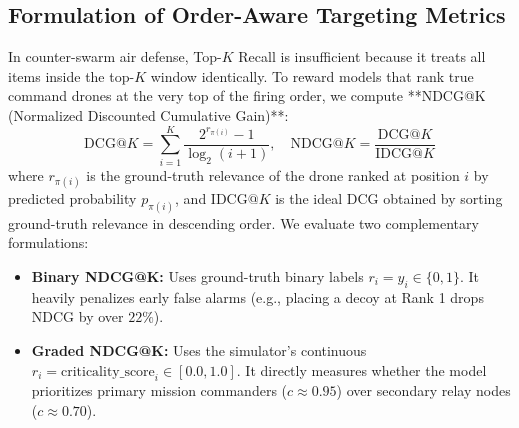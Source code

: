 \documentclass[9pt]{ieeeconf}
\begin{document}
\subsection{Formulation of Order-Aware Targeting Metrics}
In counter-swarm air defense, Top-$K$ Recall is insufficient because it treats all items inside the top-$K$ window identically. To reward models that rank true command drones at the very top of the firing order, we compute **NDCG@K (Normalized Discounted Cumulative Gain)**:
\begin{equation}
\text{DCG}@K = \sum_{i=1}^K \frac{2^{r_{\pi(i)}} - 1}{\log_2(i + 1)}, \quad \text{NDCG}@K = \frac{\text{DCG}@K}{\text{IDCG}@K}
\end{equation}
where $r_{\pi(i)}$ is the ground-truth relevance of the drone ranked at position $i$ by predicted probability $p_{\pi(i)}$, and $\text{IDCG}@K$ is the ideal DCG obtained by sorting ground-truth relevance in descending order. We evaluate two complementary formulations:
\begin{itemize}
    \item \textbf{Binary NDCG@K:} Uses ground-truth binary labels $r_i = y_i \in \{0, 1\}$. It heavily penalizes early false alarms (e.g., placing a decoy at Rank 1 drops NDCG by over $22\%$).
    \item \textbf{Graded NDCG@K:} Uses the simulator's continuous $r_i = \text{criticality\_score}_i \in [0.0, 1.0]$. It directly measures whether the model prioritizes primary mission commanders ($c \approx 0.95$) over secondary relay nodes ($c \approx 0.70$).
\end{itemize}
\end{document}

